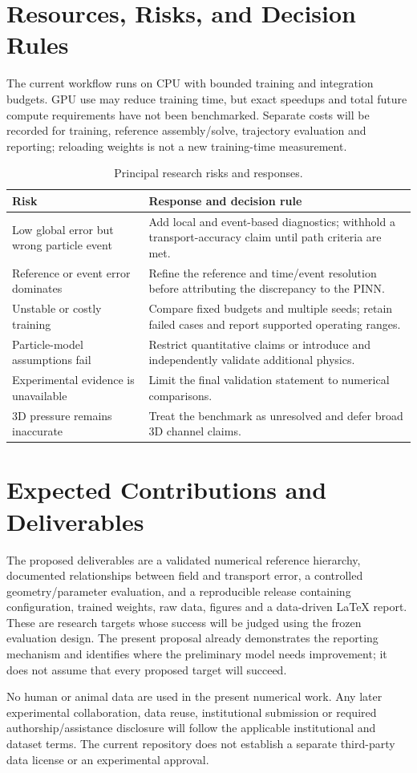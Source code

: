 \section{Resources, Risks, and Decision Rules}
The current workflow runs on CPU with bounded training and integration
budgets. GPU use may reduce training time, but exact speedups and total
future compute requirements have not been benchmarked. Separate costs will
be recorded for training, reference assembly/solve, trajectory evaluation
and reporting; reloading weights is not a new training-time measurement.

\begin{table}[!htbp]
\centering\small
\caption{Principal research risks and responses.}
\label{tab:risks}
\begin{tabularx}{\textwidth}{@{}YY@{}}
\toprule Risk & Response and decision rule\\\midrule
Low global error but wrong particle event & Add local and event-based diagnostics; withhold a transport-accuracy claim until path criteria are met.\\
Reference or event error dominates & Refine the reference and time/event resolution before attributing the discrepancy to the PINN.\\
Unstable or costly training & Compare fixed budgets and multiple seeds; retain failed cases and report supported operating ranges.\\
Particle-model assumptions fail & Restrict quantitative claims or introduce and independently validate additional physics.\\
Experimental evidence is unavailable & Limit the final validation statement to numerical comparisons.\\
3D pressure remains inaccurate & Treat the benchmark as unresolved and defer broad 3D channel claims.\\
\bottomrule
\end{tabularx}
\end{table}

\section{Expected Contributions and Deliverables}
The proposed deliverables are a validated numerical reference hierarchy,
documented relationships between field and transport error, a controlled
geometry/parameter evaluation, and a reproducible release containing
configuration, trained weights, raw data, figures and a data-driven LaTeX
report. These are research targets whose success will be judged using the
frozen evaluation design. The present proposal already demonstrates the
reporting mechanism and identifies where the preliminary model needs
improvement; it does not assume that every proposed target will succeed.

No human or animal data are used in the present numerical work. Any later
experimental collaboration, data reuse, institutional submission or required
authorship/assistance disclosure will follow the applicable institutional
and dataset terms. The current repository does not establish a separate
third-party data license or an experimental approval.
